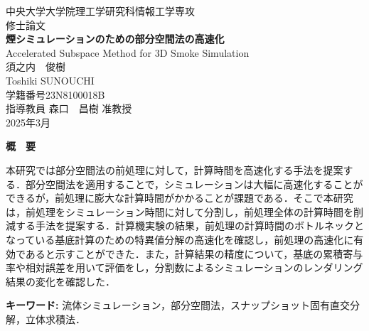 \documentclass[a4j,12pt]{jreport}
\begin{document}
\thispagestyle{empty}
\begin{center}
\begin{Large}
\vspace*{0.7cm}
{\large 中央大学大学院理工学研究科情報工学専攻\\修士論文}\\
\vspace*{2.5cm}
{\LARGE\bf 煙シミュレーションのための部分空間法の高速化}\\
\vspace*{0.7cm}
{\sf Accelerated Subspace Method for 3D Smoke Simulation}\\
\vspace*{6.5cm}
須之内　俊樹\\
Toshiki SUNOUCHI\\
学籍番号\hspace*{1zw}23N8100018B\\
\vspace*{2.5cm}
指導教員\hspace*{1zw} 森口　昌樹 准教授\\
\vspace*{2.5cm}
2025年3月\\
\end{Large}
\end{center}


\newpage
\renewcommand{\baselinestretch}{1.25} \selectfont
{}


\begin{center} {\large \bf{概　要}} \end{center}
本研究では部分空間法の前処理に対して，計算時間を高速化する手法を提案する．部分空間法を適用することで，シミュレーションは大幅に高速化することができるが，前処理に膨大な計算時間がかかることが課題である．そこで本研究は，前処理をシミュレーション時間に対して分割し，前処理全体の計算時間を削減する手法を提案する．計算機実験の結果，前処理の計算時間のボトルネックとなっている基底計算のための特異値分解の高速化を確認し，前処理の高速化に有効であると示すことができた．また，計算結果の精度について，基底の累積寄与率や相対誤差を用いて評価をし，分割数によるシミュレーションのレンダリング結果の変化を確認した．

\vspace{1zw} \noindent
{\bf キーワード: }流体シミュレーション，部分空間法，スナップショット固有直交分解，立体求積法．

\tableofcontents
\end{document}

